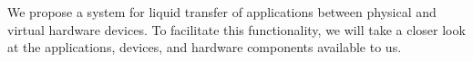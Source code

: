 We propose a system for liquid transfer of applications between physical and virtual hardware devices.
To facilitate this functionality, we will take a closer look at the applications, devices, and hardware components available to us.